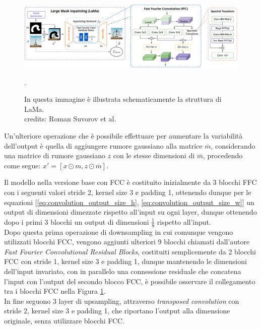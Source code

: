 \begin{figure}[H]
    \centering
    \includegraphics[width=1.0\textwidth]{imgs/lama_model.png}
    \caption{In questa immagine è illustrata schematicamente la struttura di LaMa.\\
        credits: Roman Suvorov et al. \cite{suvorov2021resolutionrobust}}.
    \label{fig:lama_architecture}
\end{figure}

Un'ulteriore operazione che è possibile effettuare per aumentare la variabilità dell'output è quella di aggiungere rumore gaussiano alla matrice
$\overline{m}$, considerando una matrice di rumore gaussiano $z$ con le stesse dimensioni di $\overline{m}$, procedendo come segue:
$ x' = [x \odot m, z \odot \overline{m}]$.



Il modello nella versione base con FCC è costituito inizialmente da 3 blocchi FFC con i seguenti valori stride 2, kernel size 3 e padding 1,
ottenendo dunque per le equazioni [\ref{eq:convolution_output_size_h}, \ref{eq:convolution_output_size_w}] un output di dimensioni dimezzate rispetto all'input
su ogni layer, dunque ottenendo dopo i primi 3 blocchi un output di dimensioni $\frac{1}{8}$ rispetto all'input.\\
Dopo questa prima operazione di downsampling in cui comunque vengono utilizzati blocchi FCC, vengono aggiunti ulteriori 9 blocchi
chiamati dall'autore \textit{Fast Fourier Convolutional Residual Blocks}, costituiti semplicemente da 2 blocchi FCC con stride 1, kernel size 3 e padding 1,
dunque mantenendo le dimensioni dell'input invariato, con in parallelo una connessione residuale che concatena l'input con l'output del secondo blocco FCC,
è possibile osservare il collegamento tra i blocchi FCC nella Figura \ref{fig:lama_architecture}.\\
In fine seguono 3 layer di upsampling, attraverso \textit{transposed convolution} con stride 2, kernel size 3 e padding 1, che riportano l'output alla 
dimensione originale, senza utilizzare blocchi FCC.

